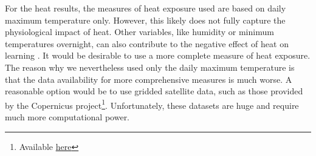 For the heat results, the measures of heat exposure used are based on daily maximum temperature only. However, this likely does not fully capture the physiological impact of heat. Other variables, like humidity or minimum temperatures overnight, can also contribute to the negative effect of heat on learning \citep[for an extensive discussion of heat exposure measurement see][]{Rennie_2021}. It would be desirable to use a more complete measure of heat exposure. The reason why we nevertheless used only the daily maximum temperature is that the data availability for more comprehensive measures is much worse. A reasonable option would be to use gridded satellite data, such as those provided by the Copernicus project\footnote{Available \href{https://climate.copernicus.eu/}{here}}. Unfortunately, these datasets are huge and require much more computational power.


